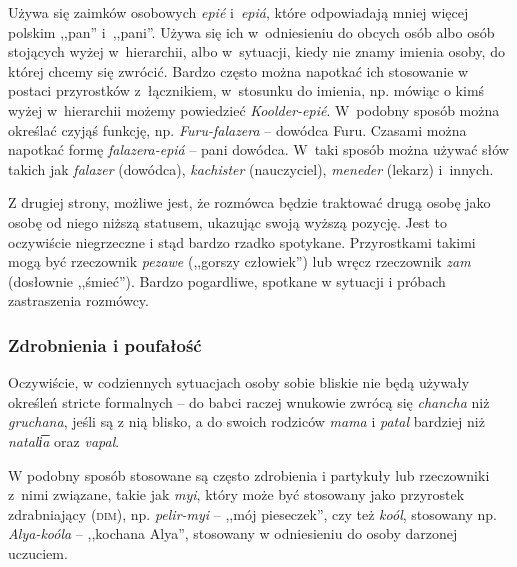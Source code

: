 \begin{spacing}{1.1}
Używa się zaimków osobowych \emph{epié} i~\emph{epiá}, które odpowiadają mniej
więcej polskim ,,pan'' i~,,pani''. Używa się ich w~odniesieniu do obcych osób
albo osób stojących wyżej w~hierarchii, albo w~sytuacji, kiedy nie znamy imienia
osoby, do której chcemy się zwrócić. Bardzo często można napotkać ich stosowanie
w postaci przyrostków z~łącznikiem, w~stosunku do imienia, np. mówiąc o kimś
wyżej w~hierarchii możemy powiedzieć \emph{Koolder-epié}. W~podobny sposób
można określać czyjąś funkcję, np. \emph{Furu-falazera} -- dowódca Furu. Czasami
można napotkać formę \emph{falazera-epiá} -- pani dowódca. W~taki sposób można
używać słów takich jak \emph{falazer} (dowódca), \emph{kachister} (nauczyciel),
\emph{meneder} (lekarz) i~innych.


\skipline

Z drugiej strony, możliwe jest, że rozmówca będzie traktować drugą osobę jako
osobę od niego niższą statusem, ukazując swoją wyższą pozycję. Jest to
oczywiście niegrzeczne i stąd bardzo rzadko spotykane. Przyrostkami takimi mogą
być rzeczownik \emph{pezawe} (,,gorszy człowiek'') lub wręcz rzeczownik
\emph{zam} (dosłownie ,,śmieć''). Bardzo pogardliwe, spotkane w sytuacji i
próbach zastraszenia rozmówcy.

\subsubsection{Zdrobnienia i poufałość}

Oczywiście, w codziennych sytuacjach osoby sobie bliskie nie będą używały
określeń stricte formalnych -- do babci raczej wnukowie zwrócą się
\emph{chancha} niż \emph{gruchana}, jeśli są z nią blisko, a do swoich rodziców
\emph{mama} i \emph{patal} bardziej niż \emph{natali͞a} oraz \emph{vapal}.

W podobny sposób stosowane są często zdrobienia i partykuły lub rzeczowniki
z~nimi związane, takie jak \emph{myi}, który może być stosowany jako przyrostek
zdrabniający (\textsc{dim}), np. \emph{pelir-myi} -- ,,mój pieseczek'', czy też
\emph{koól}, stosowany np. \emph{Alya-koóla} -- ,,kochana Alya'', stosowany w
odniesieniu do osoby darzonej uczuciem.


\end{spacing}
